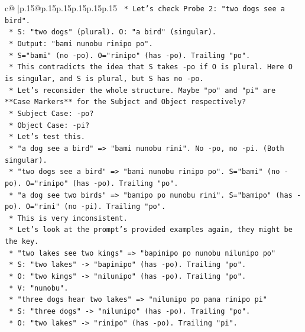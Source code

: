 \documentclass{article}
\begin{document}
{\begin{supertabular}{c@{$\;$}|p{.15\linewidth}@{}p{.15\linewidth}p{.15\linewidth}p{.15\linewidth}p{.15\linewidth}p{.15\linewidth}}
{{{\texttt{        *   Let's check Probe 2: "two dogs see a bird".} \\
\texttt{            *   S: "two dogs" (plural). O: "a bird" (singular).} \\
\texttt{            *   Output: "bami nunobu rinipo po".} \\
\texttt{            *   S="bami" (no {-}po). O="rinipo" (has {-}po). Trailing "po".} \\
\texttt{            *   This contradicts the idea that S takes {-}po if O is plural. Here O is singular, and S is plural, but S has no {-}po.} \\
\texttt{    *   Let's reconsider the whole structure. Maybe "po" and "pi" are **Case Markers** for the Subject and Object respectively?} \\
\texttt{        *   Subject Case: {-}po?} \\
\texttt{        *   Object Case: {-}pi?} \\
\texttt{        *   Let's test this.} \\
\texttt{        *   "a dog see a bird" => "bami nunobu rini". No {-}po, no {-}pi. (Both singular).} \\
\texttt{        *   "two dogs see a bird" => "bami nunobu rinipo po". S="bami" (no {-}po). O="rinipo" (has {-}po). Trailing "po".} \\
\texttt{        *   "a dog see two birds" => "bamipo po nunobu rini". S="bamipo" (has {-}po). O="rini" (no {-}pi). Trailing "po".} \\
\texttt{        *   This is very inconsistent.} \\
\texttt{    *   Let's look at the prompt's provided examples again, they might be the key.} \\
\texttt{        *   "two lakes see two kings" => "bapinipo po nunobu nilunipo po"} \\
\texttt{            *   S: "two lakes" {-}> "bapinipo" (has {-}po). Trailing "po".} \\
\texttt{            *   O: "two kings" {-}> "nilunipo" (has {-}po). Trailing "po".} \\
\texttt{            *   V: "nunobu".} \\
\texttt{        *   "three dogs hear two lakes" => "nilunipo po pana rinipo pi"} \\
\texttt{            *   S: "three dogs" {-}> "nilunipo" (has {-}po). Trailing "po".} \\
\texttt{            *   O: "two lakes" {-}> "rinipo" (has {-}po). Trailing "pi".} \\
}}}
\end{supertabular}}
\end{document}
